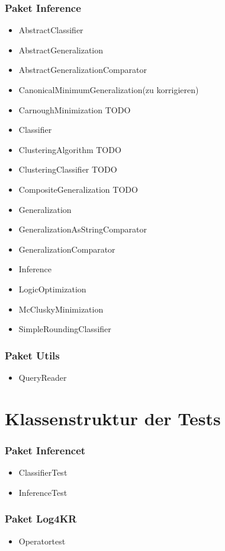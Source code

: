 \documentclass[a4paper, 11pt]{book}
\begin{document}
{\subsubsection{Paket Inference}
\begin{itemize}
	\item AbstractClassifier
	\item AbstractGeneralization
	\item AbstractGeneralizationComparator
	\item CanonicalMinimumGeneralization(zu korrigieren)
	\item CarnoughMinimization TODO
	\item Classifier
	\item ClusteringAlgorithm TODO
	\item ClusteringClassifier TODO
	\item CompositeGeneralization TODO
	\item Generalization
	\item GeneralizationAsStringComparator
	\item GeneralizationComparator
	\item Inference
	\item LogicOptimization
	\item McCluskyMinimization
	\item SimpleRoundingClassifier
\end{itemize}
\subsubsection{Paket Utils}
\begin{itemize}
	\item QueryReader
\end{itemize}
\section{Klassenstruktur der Tests}
\subsubsection{Paket Inferencet}
\begin{itemize}
	\item ClassifierTest
	\item InferenceTest
\end{itemize}
\subsubsection{Paket Log4KR}
\begin{itemize}
	\item Operatortest
\end{itemize}
}
\end{document}
